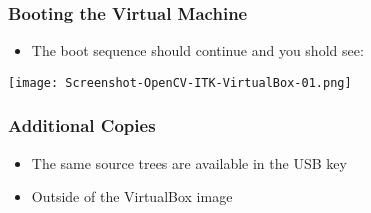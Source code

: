 \begin{frame}
\frametitle{Booting the Virtual Machine}
\begin{itemize}
\item The boot sequence should continue and you shold see:
\end{itemize}
\begin{center}
  \texttt{[image: Screenshot-OpenCV-ITK-VirtualBox-01.png]}
\end{center}
\end{frame}


\begin{frame}
\frametitle{Additional Copies}
\begin{itemize}
\item The same source trees are available in the USB key
\item Outside of the VirtualBox image
\end{itemize}
\end{frame}

